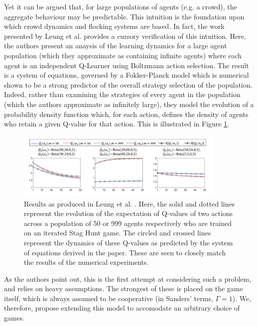 \documentclass[.../main.tex]{subfiles}
\begin{document}
    Yet it can be argued that, for large populations of agents (e.g. a crowd), the aggregate
    behaviour may be predictable. This intuition is the foundation upon which crowd dynamics and
    flocking systems are based. In fact, the work presented by Leung et al. \cite{Hu2019} provides a
    cursory verification of this intuition. Here, the authors present an anaysis of the learning
    dynamics for a large agent population (which they approximate as containing infinite agents)
    where each agent is an independent Q-Learner using Boltzmann action selection. The
    result is a system of equations, governed by a Fokker-Planck model which is numerical shown to be a 
    strong predictor of the overall strategy selection of the population. Indeed, rather than
    examining the strategies of every agent in the population (which the authors approximate as
    infinitely large), they model the evolution of a probability density function which, for each
    action, defines the density of agents who retain a given Q-value for that action. This is
    illustrated in Figure \ref{fig::LeungPredictions}.

    \begin{figure}[h]
    	\centering
    	\includegraphics[width=0.9\textwidth]{Figures/LeungPredictions}
    	\caption{ \label{fig::LeungPredictions} Results as produced in Leung et al. \cite{Hu2019}.
    	Here, the solid and dotted lines represent the evolution of the expectation of Q-values of
    	two actions across a population of 50 or 999 agents respectively who are trained on an
    	iterated Stag Hunt game. The circled and crossed
    	lines represent the dynamics of these Q-values as predicted by the system of equations
    	derived in the paper. These are seen to closely match the results of the numerical
    	experiments.}
    \end{figure}

   	As the authors point out, this is the first attempt at considering such a problem, and relies on
	heavy assumptions. The strongest of these is placed on the game itself, which is always
	assumed to be cooperative (in Sanders' terms, $\Gamma = 1$). We, therefore, propose extending
	this model to accomodate an arbitrary choice of games. 
\end{document}
